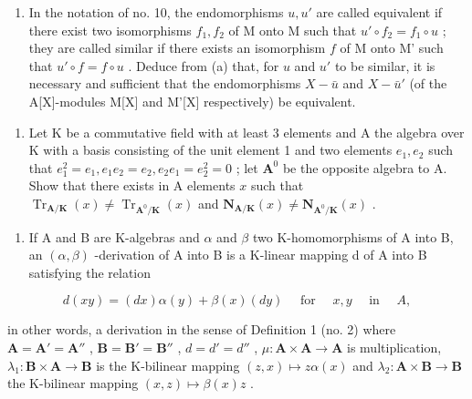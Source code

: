\begin{enumerate}
\def\labelenumi{(\alph{enumi})}
\setcounter{enumi}{1}
\tightlist
\item
  In the notation of no. 10, the endomorphisms \(u, u'\) are called equivalent if there exist two isomorphisms \(f_1, f_2\) of M onto M such that \(u' \circ f_2 = f_1 \circ u\) ; they are called similar if there exists an isomorphism \(f\) of M onto M' such that \(u' \circ f = f \circ u\) . Deduce from (a) that, for \(u\) and \(u'\) to be similar, it is necessary and sufficient that the endomorphisms \(X - \bar{u}\) and \(X - \bar{u}'\) (of the A{[}X{]}-modules M{[}X{]} and M'{[}X{]} respectively) be equivalent.
\end{enumerate}

\BourbakiExercisesSection

\begin{enumerate}
\def\labelenumi{\arabic{enumi}.}
\tightlist
\item
  Let K be a commutative field with at least 3 elements and A the algebra over K with a basis consisting of the unit element 1 and two elements \(e_1, e_2\) such that \(e_1^2 = e_1, e_1e_2 = e_2, e_2e_1 = e_2^2 = 0\) ; let \(\mathbf{A}^0\) be the opposite algebra to A. Show that there exists in A elements \(x\) such that \(\operatorname{Tr}_{\mathbf{A} / \mathbf{K}}(x) \neq \operatorname{Tr}_{\mathbf{A}^0 / \mathbf{K}}(x)\) and \(\mathbf{N}_{\mathbf{A} / \mathbf{K}}(x) \neq \mathbf{N}_{\mathbf{A}^0 / \mathbf{K}}(x)\) .
\end{enumerate}

\BourbakiExercisesSection

\begin{enumerate}
\def\labelenumi{\arabic{enumi}.}
\tightlist
\item
  If A and B are K-algebras and \(\alpha\) and \(\beta\) two K-homomorphisms of A into B, an \((\alpha, \beta)\) -derivation of A into B is a K-linear mapping d of A into B satisfying the relation
\end{enumerate}

\[
d (x y) = (d x) \alpha (y) + \beta (x) (d y) \quad \text { for } \quad x, y \quad \text { in } \quad A,
\]

in other words, a derivation in the sense of Definition 1 (no. 2) where \(\mathbf{A} = \mathbf{A}' = \mathbf{A}''\) , \(\mathbf{B} = \mathbf{B}' = \mathbf{B}''\) , \(d = d' = d''\) , \(\mu: \mathbf{A} \times \mathbf{A} \to \mathbf{A}\) is multiplication, \(\lambda_1: \mathbf{B} \times \mathbf{A} \to \mathbf{B}\) is the K-bilinear mapping \((z, x) \mapsto z\alpha(x)\) and \(\lambda_2: \mathbf{A} \times \mathbf{B} \to \mathbf{B}\) the K-bilinear mapping \((x, z) \mapsto \beta(x)z\) .


